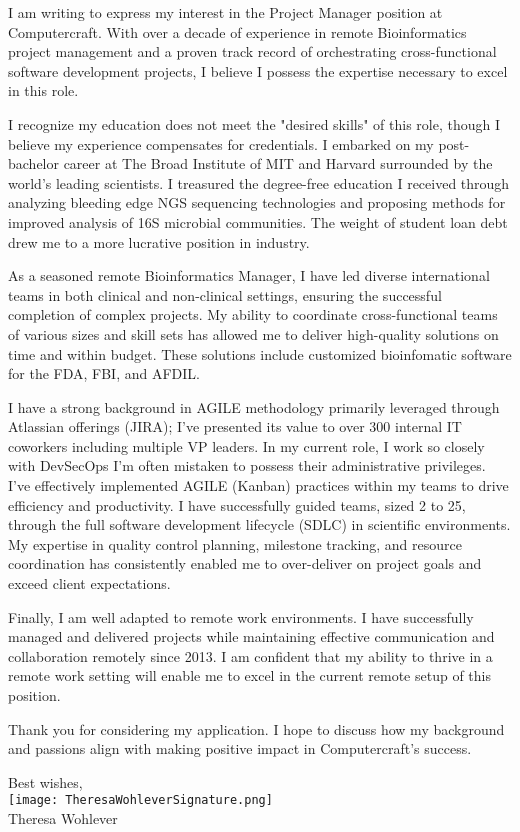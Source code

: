 \documentclass[10pt,letterpaper]{article}
\begin{document}
\begin{flushleft}

I am writing to express my interest in the Project Manager position at Computercraft. With over a decade of experience in remote Bioinformatics project management and a proven track record of orchestrating cross-functional software development projects, I believe I possess the expertise necessary to excel in this role.

I recognize my education does not meet the "desired skills" of this role, though I believe my experience compensates for credentials. I embarked on my post-bachelor career at The Broad Institute of MIT and Harvard surrounded by the world’s leading scientists. I treasured the degree-free education I received through analyzing bleeding edge NGS sequencing technologies and proposing methods for improved analysis of 16S microbial communities. The weight of student loan debt drew me to a more lucrative position in industry.

As a seasoned remote Bioinformatics Manager, I have led diverse international teams in both clinical and non-clinical settings, ensuring the successful completion of complex projects. My ability to coordinate cross-functional teams of various sizes and skill sets has allowed me to deliver high-quality solutions on time and within budget. These solutions include customized bioinfomatic software for the FDA, FBI, and AFDIL.
	
I have a strong background in AGILE methodology primarily leveraged through Atlassian offerings (JIRA); I've presented its value to over 300 internal IT coworkers including multiple VP leaders. In my current role, I work so closely with DevSecOps I'm often mistaken to possess their administrative privileges. I've effectively implemented AGILE (Kanban) practices within my teams to drive efficiency and productivity. I have successfully guided teams, sized 2 to 25, through the full software development lifecycle (SDLC) in scientific environments. My expertise in quality control planning, milestone tracking, and resource coordination has consistently enabled me to over-deliver on project goals and exceed client expectations.
	
 Finally, I am well adapted to remote work environments. I have successfully managed and delivered projects while maintaining effective communication and collaboration remotely since 2013. I am confident that my ability to thrive in a remote work setting will enable me to excel in the current remote setup of this position.
	
 Thank you for considering my application. I hope to discuss how my background and passions align with making positive impact in Computercraft's success.

\end{flushleft}


\hspace*{.6\linewidth} Best wishes, \\
\hspace*{.57\linewidth} \texttt{[image: TheresaWohleverSignature.png]}  {\vspace{-9pt}} \\
\hspace*{.6\linewidth}  Theresa Wohlever
\end{document}
